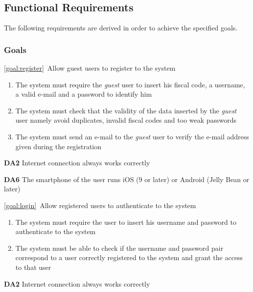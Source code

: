 \subsection{Functional Requirements}
The following requirements are derived in order to achieve the specified goals.
\subsubsection{Goals}
	\begin{description}
		\item \ref{goal:register}\ Allow guest users to register to the system
			\begin{enumerate}[label=\textbf{R\arabic*}]
			
  				\item The system must require the \emph{guest} user to insert his fiscal code, a username, a valid e-mail and a password to identify him
  				
   				\item The system must check that the validity of the data inserted by the \emph{guest} user namely avoid duplicates, invalid fiscal codes and too weak passwords
   				
   				\item The system must send an e-mail to the \emph{guest} user to verify the e-mail address given during the registration
   
  			\end{enumerate}
  				
				\textbf{DA2} Internet connection always works correctly
				
				\textbf{DA6} The smartphone of the user runs iOS (9 or later) or Android (Jelly Bean or later)
			
  			
		\item \ref{goal:login}\ Allow registered users to authenticate to the system
			\begin{enumerate}[label=\textbf{R\arabic*}, resume]
  				\item The system must require the user to insert his username and password to authenticate to the system
   				\item The system must be able to check if the username and password pair correspond to a user correctly registered to the system and grant the access to that user

			\end{enumerate}
			
			\textbf{DA2} Internet connection always works correctly
			

\end{description}
